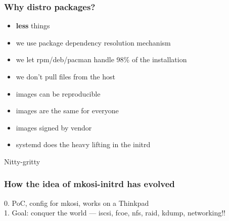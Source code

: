 \documentclass[]{beamer}
\newcommand\pp{}
\newcommand{\secsec}[1]{\begin{frame}[c]\Huge \textsc #1\end{frame}}
\begin{document}
\begin{frame}
  \frametitle{Why distro packages?}

  \begin{itemize}
    \pp
  \item \textbf{less} things
    \pp
  \item we use package dependency resolution mechanism
    \pp
  \item we let rpm/deb/pacman handle 98\% of the installation
    \pp
  \item we don't pull files from the host
    \pp
  \item images can be reproducible
    \pp
  \item images are the same for everyone
    \pp
  \item images signed by vendor
    \pp
  \item systemd does the heavy lifting in the initrd
  \end{itemize}
\end{frame}






\secsec{Nitty-gritty}

\begin{frame}[fragile]
  \frametitle{How the idea of mkosi-initrd has evolved}

  \pp
  0. PoC, config for mkosi, works on a Thinkpad
  \\

  \pp
  1. Goal: conquer the world — iscsi, fcoe, nfs, raid, kdump, networking!!
\end{frame}
\end{document}
